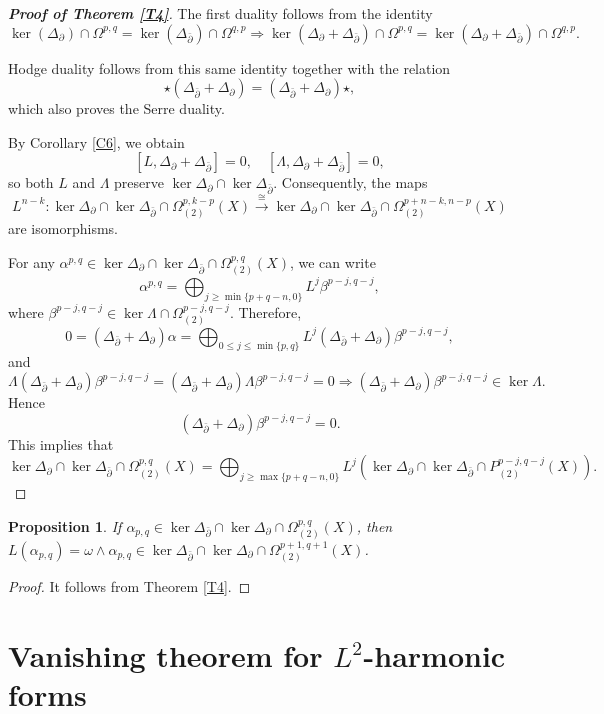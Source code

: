 \documentclass[12pt, twoside]{article}
\newtheorem{proposition}[theorem]{Proposition}
\theoremstyle{definition}
\numberwithin{equation}{section}
\def \a {\alpha }
\def \b {\beta}
\def \De {\Delta}
\def \La {\Lambda}
\def\w {\omega}
\def\Om{\Omega}
\def\pa{\partial}
\begin{document}
	\begin{proof}[\textbf{Proof of Theorem \ref{T4}}]
	The first duality follows from the identity
	$$\ker(\De_{\pa})\cap\Om^{p,q}=\ker(\De_{\bar{\pa}})\cap\Om^{q,p}
	\Rightarrow\ker(\De_{\pa}+\De_{\bar{\pa}})\cap\Om^{p,q}=\ker(\De_{\pa}+\De_{\bar{\pa}})\cap\Om^{q,p}.$$

	 Hodge duality follows from this same identity together with the relation \[\star(\De_{\bar{\pa}}+\De_{\pa})=(\De_{\bar{\pa}}+\De_{\pa})\star,\]
	 which also proves the Serre duality.	
		
	By Corollary \ref{C6}, we obtain
	$$[L,\De_{\pa}+\De_{\bar{\pa}}]=0,\quad [\La,\De_{\pa}+\De_{\bar{\pa}}]=0,$$
	so both $L$ and $\La$ preserve $\ker{\De_{\pa}}\cap\ker{\De_{\bar{\pa}}}$. Consequently, the maps
	$$L^{n-k}:\ker{\De_{\pa}}\cap\ker{\De_{\bar{\pa}}}\cap\Om^{p,k-p}_{(2)}(X)\stackrel{\cong}
	{\longrightarrow}
	\ker{\De_{\pa}}\cap\ker{\De_{\bar{\pa}}}\cap\Om^{p+n-k,n-p}_{(2)}(X)$$
	are isomorphisms. 
	
	For any $\a^{p,q}\in\ker{\De_{\pa}}\cap\ker{\De_{\bar{\pa}}}\cap\Om^{p,q}_{(2)}(X)$, we can write
	\[\a^{p,q}=\bigoplus_{j\geq\min\{p+q-n,0\} }L^{j}\b^{p-j,q-j},\]
	where $\b^{p-j,q-j}\in\ker\La\cap\Om_{(2)}^{p-j,q-j}$. Therefore,
\[ 0=(\De_{\bar{\pa}}+\De_{\pa})\a= \bigoplus_{0\leq j\leq\min\{p,q\} }L^{j}(\De_{\bar{\pa}}+\De_{\pa})\b^{p-j,q-j},\]
and	
	\[\La(\De_{\bar{\pa}}+\De_{\pa})\b^{p-j,q-j}=(\De_{\bar{\pa}}+\De_{\pa})\La\b^{p-j,q-j}=0\Rightarrow(\De_{\bar{\pa}}+\De_{\pa})\b^{p-j,q-j}\in\ker\La.\]
Hence \[(\De_{\bar{\pa}}+\De_{\pa})\b^{p-j,q-j}=0.\]
This implies that
$$\ker{\De_{\pa}}\cap\ker{\De_{\bar{\pa}}}\cap\Om^{p,q}_{(2)}(X)=\bigoplus_{j\geq\max\{p+q-n,0\}}L^{j}(\ker{\De_{\pa}}\cap\ker{\De_{\bar{\pa}}}\cap P^{p-j,q-j}_{(2)}(X)).$$
	\end{proof}
	\begin{proposition}\label{P3}
		If $\a_{p,q}\in\ker{\De_{\bar{\pa}}}\cap\ker{\De_{\pa}}\cap\Om^{p,q}_{(2)}(X)$, then $L(\a_{p,q})=\w\wedge\a_{p,q}\in\ker{\De_{\bar{\pa}}}\cap\ker{\De_{\pa}}\cap\Om^{p+1,q+1}_{(2)}(X)$.
	\end{proposition}
	\begin{proof}
		It follows from Theorem \ref{T4}.
	\end{proof}




	\section{Vanishing theorem for $L^{2}$-harmonic forms}
\end{document}
